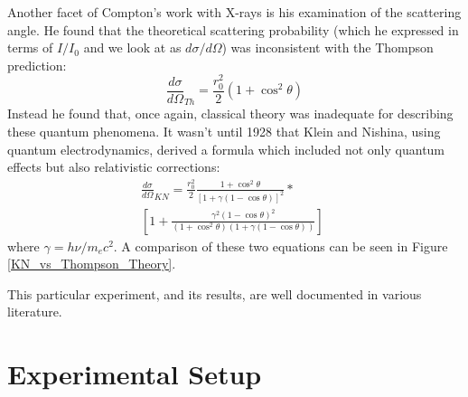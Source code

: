 \documentclass[%
 reprint,
 amsmath,amssymb,
 aps,
 pra,
]{revtex4-1}
\begin{document}
Another facet of Compton's work with X-rays is his examination of the scattering angle. He found that the theoretical scattering probability (which he expressed in terms of $I/I_0$ and we look at as $d\sigma / d\Omega$) was inconsistent with the Thompson prediction:
\begin{equation}\label{eq:thompson}
	\frac{d \sigma}{d \Omega}_{Th} = \frac{r_0^2}{2}(1+\cos^2{\theta})
\end{equation}
Instead he found that, once again, classical theory was inadequate for describing these quantum phenomena. It wasn't until 1928 that Klein and Nishina, using quantum electrodynamics, derived a formula which included not only quantum effects but also relativistic corrections:
\begin{gather}
	\frac{d \sigma}{d \Omega}_{KN} = \frac{r_0^2}{2} \frac{1 + \cos^2{\theta}}{[1 + \gamma(1 - \cos{\theta})]^2} \nonumber * ~~~~~~~~~~~~ \\
	\left[ 1 + \frac{\gamma^2(1 - \cos{\theta})^2}{(1 + \cos^2{\theta})(1+ \gamma(1 - \cos{\theta}))}\right] 
	\label{eq:kn}
\end{gather}
where $\gamma = h\nu / m_e c^2$. A comparison of these two equations can be seen in Figure \ref{KN_vs_Thompson_Theory}.

This particular experiment, and its results, are well documented in various literature.

\section{Experimental Setup}
\end{document}
